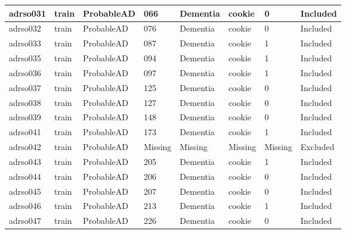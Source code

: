 \begin{center}
\begin{longtable}{|l|l|l|l|l|l|l|l|}
adrso031  & train            & ProbableAD   & 066         & Dementia             & cookie          & 0                & Included      \\ \hline
adrso032  & train            & ProbableAD   & 076         & Dementia             & cookie          & 0                & Included      \\ \hline
adrso033  & train            & ProbableAD   & 087         & Dementia             & cookie          & 1                & Included      \\ \hline
adrso035  & train            & ProbableAD   & 094         & Dementia             & cookie          & 1                & Included      \\ \hline
adrso036  & train            & ProbableAD   & 097         & Dementia             & cookie          & 1                & Included      \\ \hline
adrso037  & train            & ProbableAD   & 125         & Dementia             & cookie          & 0                & Included      \\ \hline
adrso038  & train            & ProbableAD   & 127         & Dementia             & cookie          & 0                & Included      \\ \hline
adrso039  & train            & ProbableAD   & 148         & Dementia             & cookie          & 0                & Included      \\ \hline
adrso041  & train            & ProbableAD   & 173         & Dementia             & cookie          & 1                & Included      \\ \hline
adrso042  & train            & ProbableAD   & Missing     & Missing              & Missing         & Missing          & Excluded      \\ \hline
adrso043  & train            & ProbableAD   & 205         & Dementia             & cookie          & 1                & Included      \\ \hline
adrso044  & train            & ProbableAD   & 206         & Dementia             & cookie          & 0                & Included      \\ \hline
adrso045  & train            & ProbableAD   & 207         & Dementia             & cookie          & 0                & Included      \\ \hline
adrso046  & train            & ProbableAD   & 213         & Dementia             & cookie          & 1                & Included      \\ \hline
adrso047  & train            & ProbableAD   & 226         & Dementia             & cookie          & 0                & Included      \\ \hline

\end{longtable}
\end{center}
